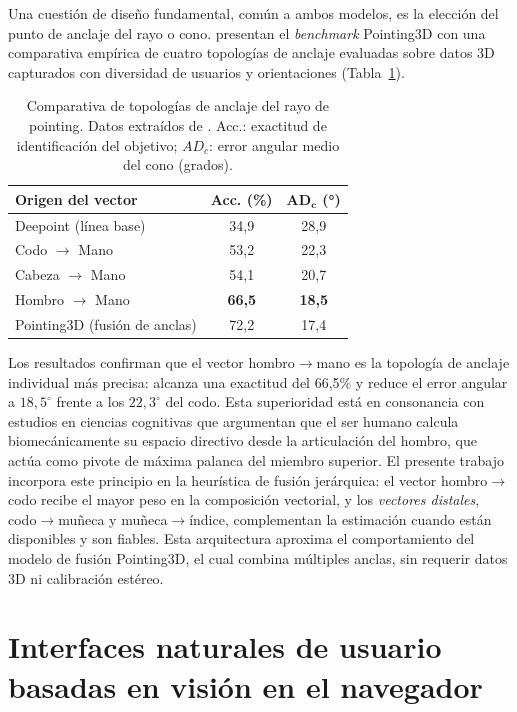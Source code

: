 \documentclass[12pt]{report} %
\begin{document}
Una cuestión de diseño fundamental, común a ambos modelos, es la elección del punto de anclaje del rayo o cono. \citet{arslanoglu2025pointing3d} presentan el \textit{benchmark} Pointing3D con una comparativa empírica de cuatro topologías de anclaje evaluadas sobre datos 3D capturados con diversidad de usuarios y orientaciones (Tabla~\ref{tab:ancla}).

\begin{table}[H]
\caption{\label{tab:ancla}Comparativa de topologías de anclaje del rayo de pointing. Datos extraídos de \citet{arslanoglu2025pointing3d}. Acc.: exactitud de identificación del objetivo; $AD_c$: error angular medio del cono (grados).}
\begin{tabular}{lcc}
\hline
\textbf{Origen del vector} & \textbf{Acc. (\%)} & $\boldsymbol{AD_c}$ \textbf{(°)} \\
\hline
Deepoint (línea base) & 34,9 & 28,9 \\
Codo $\rightarrow$ Mano & 53,2 & 22,3 \\
Cabeza $\rightarrow$ Mano & 54,1 & 20,7 \\
Hombro $\rightarrow$ Mano & \textbf{66,5} & \textbf{18,5} \\
Pointing3D (fusión de anclas) & 72,2 & 17,4 \\
\hline
\end{tabular}
\end{table}

Los resultados confirman que el vector hombro$\rightarrow$mano es la topología de anclaje individual más precisa: alcanza una exactitud del 66,5\% y reduce el error angular a $18{,}5^{\circ}$ frente a los $22{,}3^{\circ}$ del codo. Esta superioridad está en consonancia con estudios en ciencias cognitivas que argumentan que el ser humano calcula biomecánicamente su espacio directivo desde la articulación del hombro, que actúa como pivote de máxima palanca del miembro superior. El presente trabajo incorpora este principio en la heurística de fusión jerárquica: el vector hombro$\rightarrow$codo recibe el mayor peso en la composición vectorial, y los \textit{vectores distales}, codo$\rightarrow$muñeca y muñeca$\rightarrow$índice, complementan la estimación cuando están disponibles y son fiables. Esta arquitectura aproxima el comportamiento del modelo de fusión Pointing3D, el cual combina múltiples anclas, sin requerir datos 3D ni calibración estéreo.

\section{Interfaces naturales de usuario basadas en visión en el navegador}
\end{document}
